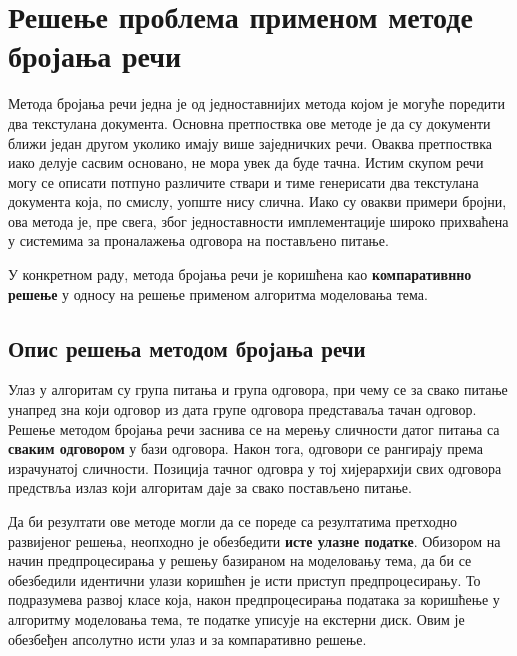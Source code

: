 \chapter{Решење проблема применом методе бројања речи}

Метода бројања речи једна је од једноставнијих метода којом  је могуће поредити два текстулана документа.  Основна претпоствка ове методе је да су документи ближи један другом уколико  имају више заједничких речи.  Оваква претпоствка иако делује сасвим основано, не мора увек да буде тачна. Истим скупом речи могу се описати потпуно различите ствари и тиме генерисати два текстулана документа која, по смислу, уопште нису слична. Иако су овакви примери бројни, ова метода је, пре свега, због једноставности имплементације широко прихваћена у системима за проналажења одговора на постављено питање.

У конкретном раду, метода бројања речи је коришћена као \textbf{компаративнно решење} у односу на решење применом алгоритма моделовања тема. 

\section{Опис решења методом бројања речи}

Улаз у алгоритам су група питања и група одговора, при чему се за свако питање унапред зна који одговор из дата групе одговора представаља тачан одговор. Решење методом бројања речи заснива се на мерењу сличности датог  питања са \textbf{сваким одговором} у бази одговора. Након тога, одговори се рангирају према израчунатој сличности. Позиција тачног одговра у тој хијерархији свих одговора предствља излаз који алгоритам даје за свако постављено питање. 

Да би резултати ове методе могли да се пореде са резултатима претходно развијеног решења, неопходно је обезбедити \textbf{исте улазне податке}. Обизором на начин предпроцесирања у решењу базираном на моделовању тема, да би се обезбедили идентични улази коришћен је исти приступ предпроцесирању. То подразумева развој класе која, након предпроцесирања података за коришћење у алгоритму моделовања тема, те податке уписује на екстерни диск. Овим је обезбеђен апсолутно исти улаз и за компаративно решење.

